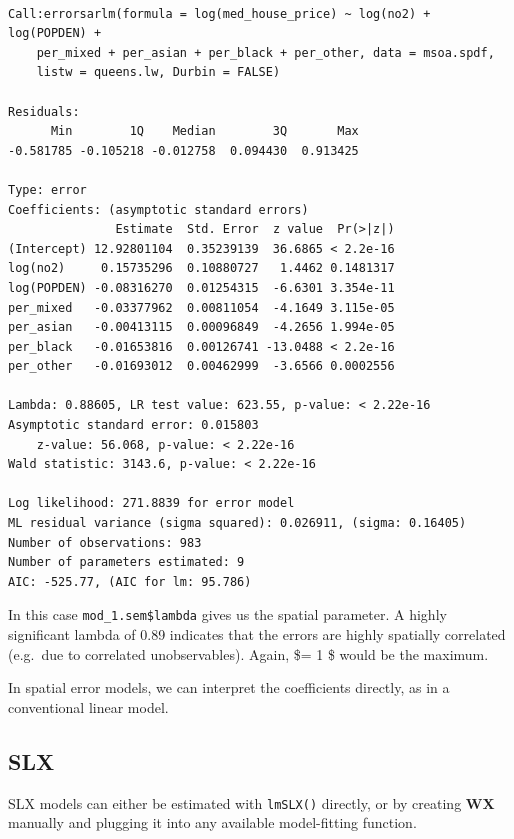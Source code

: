 \documentclass[
  letterpaper,
  DIV=11,
  numbers=noendperiod]{scrreprt}
\begin{document}
\begin{verbatim}

Call:errorsarlm(formula = log(med_house_price) ~ log(no2) + log(POPDEN) + 
    per_mixed + per_asian + per_black + per_other, data = msoa.spdf, 
    listw = queens.lw, Durbin = FALSE)

Residuals:
      Min        1Q    Median        3Q       Max 
-0.581785 -0.105218 -0.012758  0.094430  0.913425 

Type: error 
Coefficients: (asymptotic standard errors) 
               Estimate  Std. Error  z value  Pr(>|z|)
(Intercept) 12.92801104  0.35239139  36.6865 < 2.2e-16
log(no2)     0.15735296  0.10880727   1.4462 0.1481317
log(POPDEN) -0.08316270  0.01254315  -6.6301 3.354e-11
per_mixed   -0.03377962  0.00811054  -4.1649 3.115e-05
per_asian   -0.00413115  0.00096849  -4.2656 1.994e-05
per_black   -0.01653816  0.00126741 -13.0488 < 2.2e-16
per_other   -0.01693012  0.00462999  -3.6566 0.0002556

Lambda: 0.88605, LR test value: 623.55, p-value: < 2.22e-16
Asymptotic standard error: 0.015803
    z-value: 56.068, p-value: < 2.22e-16
Wald statistic: 3143.6, p-value: < 2.22e-16

Log likelihood: 271.8839 for error model
ML residual variance (sigma squared): 0.026911, (sigma: 0.16405)
Number of observations: 983 
Number of parameters estimated: 9 
AIC: -525.77, (AIC for lm: 95.786)
\end{verbatim}

In this case \texttt{mod\_1.sem\$lambda} gives us the spatial parameter.
A highly significant lambda of 0.89 indicates that the errors are highly
spatially correlated (e.g.~due to correlated unobservables). Again,
\$\lambda = 1 \$ would be the maximum.

In spatial error models, we can interpret the coefficients directly, as
in a conventional linear model.

\hypertarget{slx}{%
\subsection{SLX}\label{slx}}

SLX models can either be estimated with \texttt{lmSLX()} directly, or by
creating \(\boldsymbol{\mathbf{W}} \boldsymbol{\mathbf{X}}\) manually
and plugging it into any available model-fitting function.
\end{document}
